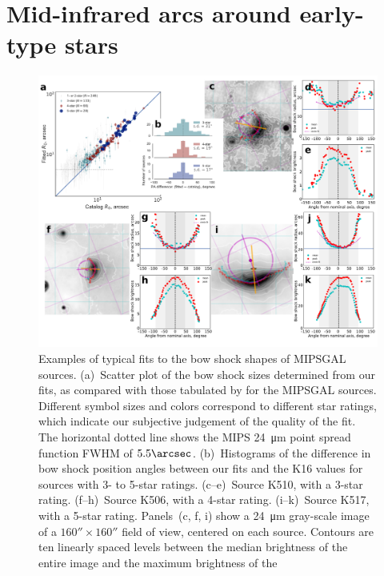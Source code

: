 \documentclass[useAMS, usenatbib, a4paper]{mnras}
\begin{document}

\section{Mid-infrared arcs around early-type stars}
\label{sec:mid-infrared-arcs}
\label{sec:comp-with-observ}

\begin{figure}
  \includegraphics[width=\linewidth]{figs/mipsgal-example-panels}
  \caption[]{Examples of typical fits to the bow shock shapes of
    MIPSGAL sources.  
    (a)~Scatter plot of the bow shock sizes determined from our fits,
    as compared with those tabulated by \citet[K16]{Kobulnicky:2016a}
    for the MIPSGAL sources.  Different symbol sizes and colors
    correspond to different star ratings, which indicate our
    subjective judgement of the quality of the fit.  The horizontal
    dotted line shows the MIPS \SI{24}{\um} point spread function
    FWHM of \(5.5\arcsec\).  
    (b)~Histograms of the difference in bow shock position angles
    between our fits and the K16 values for sources with 3- to 5-star
    ratings.  
    (c--e)~Source K510, with a 3-star rating. 
    (f--h)~Source K506, with a 4-star rating. 
    (i--k)~Source K517, with a 5-star rating. 
    Panels~(c, f, i) show a \SI{24}{\um} gray-scale image of a
    \(160'' \times 160''\) field of view, centered on each source.
    Contours are ten linearly spaced levels between the median
    brightness of the entire image and the maximum brightness of the
}
\end{figure}
\end{document}
